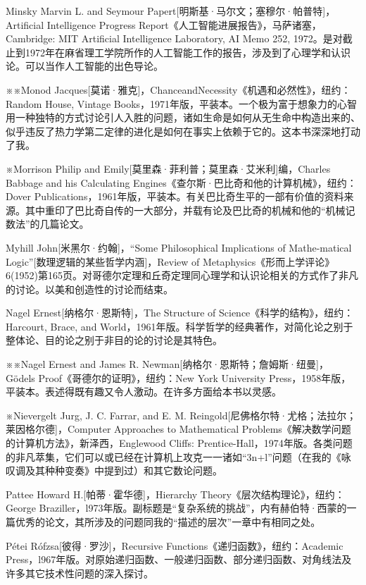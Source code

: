 \documentclass[
  12pt,
  twoside,
  openright,
  oldfontcommands,
]{memoir}
\begin{document}
Minsky Marvin L. and Seymour Papert{[}明斯基·马尔文；塞穆尔·帕普特{]}，Artificial Intelligence Progress Report《人工智能进展报告》，马萨诸塞，Cambridge: MIT Artificial Intelligence Laboratory, AI Memo 252, 1972。是对截止到1972年在麻省理工学院所作的人工智能工作的报告，涉及到了心理学和认识论。可以当作人工智能的出色导论。

※※Monod Jacques{[}莫诺·雅克{]}，ChanceandNecessity《机遇和必然性》，纽约：Random House, Vintage Books，1971年版，平装本。一个极为富于想象力的心智用一种独特的方式讨论引人入胜的问题，诸如生命是如何从无生命中构造出来的、似乎违反了热力学第二定律的进化是如何在事实上依赖于它的。这本书深深地打动了我。

※Morrison Philip and Emily{[}莫里森·菲利普；莫里森·艾米利{]}编，Charles Babbage and his Calculating Engines《查尔斯·巴比奇和他的计算机械》，纽约：Dover Publications，1961年版，平装本。有关巴比奇生平的一部有价值的资料来源。其中重印了巴比奇自传的一大部分，并载有论及巴比奇的机械和他的``机械记数法''的几篇论文。

Myhill John{[}米黑尔·约翰{]}，``Some Philosophical Implications of Mathe-matical Logic''{[}数理逻辑的某些哲学内涵{]}，Review of Metaphysics《形而上学评论》6(1952)第165页。对哥德尔定理和丘奇定理同心理学和认识论相关的方式作了非凡的讨论。以美和创造性的讨论而结束。

Nagel Ernest{[}纳格尔·恩斯特{]}，The Structure of Science《科学的结构》，纽约：Harcourt, Brace, and World，1961年版。科学哲学的经典著作，对简化论之别于整体论、目的论之别于非目的论的讨论是其特色。

※※Nagel Ernest and James R. Newman{[}纳格尔·恩斯特；詹姆斯·纽曼{]}， Gödel\textquotesingle s Proof《哥德尔的证明》，纽约：New York University Press，1958年版，平装本。表述得既有趣又令人激动。在许多方面给本书以灵感。

※Nievergelt Jurg, J. C. Farrar, and E. M. Reingold{[}尼佛格尔特·尤格；法拉尔；莱因格尔德{]}，Computer Approaches to Mathematical Problems《解决数学问题的计算机方法》，新泽西，Englewood Cliffs: Prentice-Hall，1974年版。各类问题的非凡萃集，它们可以或已经在计算机上攻克一一诸如``3n+l''问题（在我的《咏叹调及其种种变奏》中提到过）和其它数论问题。

Pattee Howard H.{[}帕蒂·霍华德{]}，Hierarchy Theory《层次结构理论》，纽约：George Braziller，l973年版。副标题是``复杂系统的挑战''，内有赫伯特·西蒙的一篇优秀的论文，其所涉及的问题同我的``描述的层次''一章中有相同之处。

Pétei Rófzsa{[}彼得·罗沙{]}，Recursive Functions《递归函数》，纽约：Academic Press，l967年版。对原始递归函数、一般递归函数、部分递归函数、对角线法及许多其它技术性问题的深入探讨。
\end{document}
